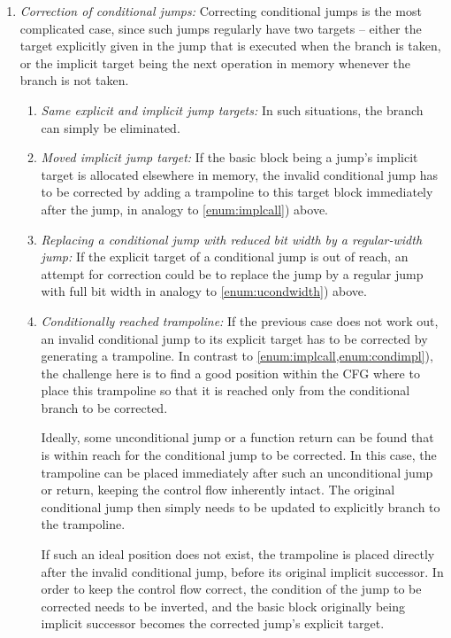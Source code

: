 \begin{enumerate}
  \item \emph{Correction of conditional jumps:} Correcting conditional jumps is the most complicated case, since such jumps regularly have two targets -- either the target explicitly given in the jump that is executed when the branch is taken, or the implicit target being the next operation in memory whenever the branch is not taken.
    \begin{enumerate}
      \item \emph{Same explicit and implicit jump targets:} In such situations, the branch can simply be eliminated.

      \item \emph{Moved implicit jump target:}\label{enum:condimpl} If the basic block being a jump's implicit target is allocated elsewhere in memory, the invalid conditional jump has to be corrected by adding a trampoline to this target block immediately after the jump, in analogy to \cref{enum:implcall}) above.

      \item \emph{Replacing a conditional jump with reduced bit width by a regular-width jump:} If the explicit target of a conditional jump is out of reach, an attempt for correction could be to replace the jump by a regular jump with full bit width in analogy to \cref{enum:ucondwidth}) above.

      \item \emph{Conditionally reached trampoline:} If the previous case does not work out, an invalid conditional jump to its explicit target has to be corrected by generating a trampoline.
      In contrast to \cref{enum:implcall,enum:condimpl}), the challenge here is to find a good position within the \gls{CFG} where to place this trampoline so that it is reached only from the conditional branch to be corrected.

      Ideally, some unconditional jump or a function return can be found that is within reach for the conditional jump to be corrected.
      In this case, the trampoline can be placed immediately after such an unconditional jump or return, keeping the control flow inherently intact.
      The original conditional jump then simply needs to be updated to explicitly branch to the trampoline.

      If such an ideal position does not exist, the trampoline is placed directly after the invalid conditional jump, before its original implicit successor.
      In order to keep the control flow correct, the condition of the jump to be corrected needs to be inverted, and the basic block originally being implicit successor becomes the corrected jump's explicit target.
    \end{enumerate}
\end{enumerate}

